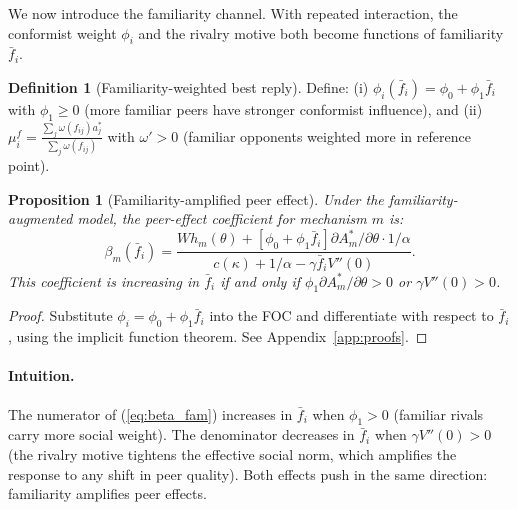 \documentclass[12pt]{article}
\newtheorem{proposition}{Proposition}
\theoremstyle{definition}
\newtheorem{definition}{Definition}
\theoremstyle{remark}
\begin{document}
We now introduce the familiarity channel.
With repeated interaction, the conformist weight $\phi_i$ and the rivalry motive
both become functions of familiarity $\bar{f}_i$.

\begin{definition}[Familiarity-weighted best reply]
Define:
(i) $\phi_i(\bar{f}_i) = \phi_0 + \phi_1 \bar{f}_i$ with $\phi_1 \geq 0$
(more familiar peers have stronger conformist influence), and
(ii) $\mu_i^f = \frac{\sum_j \omega(f_{ij}) a_j^*}{\sum_j \omega(f_{ij})}$
with $\omega' > 0$ (familiar opponents weighted more in reference point).
\end{definition}

\begin{proposition}[Familiarity-amplified peer effect]
\label{prop:fam}
Under the familiarity-augmented model, the peer-effect coefficient for mechanism $m$ is:
\begin{equation}
\beta_m(\bar{f}_i) =
  \frac{W h_m(\theta) + [\phi_0 + \phi_1 \bar{f}_i] \partial A_m^*/\partial\theta \cdot 1/\alpha}
       {c(\kappa) + 1/\alpha - \gamma \bar{f}_i V''(0)}.
\label{eq:beta_fam}
\end{equation}
This coefficient is increasing in $\bar{f}_i$ if and only if
$\phi_1 \partial A_m^*/\partial\theta > 0$ or $\gamma V''(0) > 0$.
\end{proposition}

\begin{proof}
Substitute $\phi_i = \phi_0 + \phi_1 \bar{f}_i$ into the FOC and differentiate
with respect to $\bar{f}_i$, using the implicit function theorem.
See Appendix~\ref{app:proofs}.
\end{proof}

\paragraph{Intuition.}
The numerator of (\ref{eq:beta_fam}) increases in $\bar{f}_i$ when $\phi_1 > 0$
(familiar rivals carry more social weight).
The denominator decreases in $\bar{f}_i$ when $\gamma V''(0) > 0$
(the rivalry motive tightens the effective social norm, which amplifies
the response to any shift in peer quality).
Both effects push in the same direction: familiarity amplifies peer effects.
\end{document}
